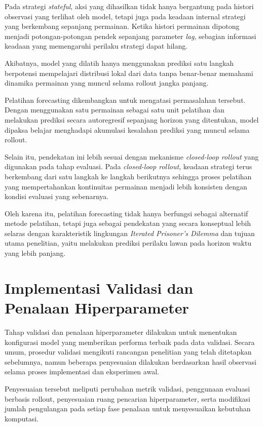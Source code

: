 Pada strategi \textit{stateful}, aksi yang dihasilkan tidak hanya bergantung pada histori observasi yang terlihat oleh model, tetapi juga pada keadaan internal strategi yang berkembang sepanjang permainan. Ketika histori permainan dipotong menjadi potongan-potongan pendek sepanjang parameter \textit{lag}, sebagian informasi keadaan yang memengaruhi perilaku strategi dapat hilang.

Akibatnya, model yang dilatih hanya menggunakan prediksi satu langkah berpotensi mempelajari distribusi lokal dari data tanpa benar-benar memahami dinamika permainan yang muncul selama rollout jangka panjang.

Pelatihan forecasting dikembangkan untuk mengatasi permasalahan tersebut. Dengan menggunakan satu permainan sebagai satu unit pelatihan dan melakukan prediksi secara autoregresif sepanjang horizon yang ditentukan, model dipaksa belajar menghadapi akumulasi kesalahan prediksi yang muncul selama rollout.

Selain itu, pendekatan ini lebih sesuai dengan mekanisme \textit{closed-loop rollout} yang digunakan pada tahap evaluasi. Pada \textit{closed-loop rollout}, keadaan strategi terus berkembang dari satu langkah ke langkah berikutnya sehingga proses pelatihan yang mempertahankan kontinuitas permainan menjadi lebih konsisten dengan kondisi evaluasi yang sebenarnya.

Oleh karena itu, pelatihan forecasting tidak hanya berfungsi sebagai alternatif metode pelatihan, tetapi juga sebagai pendekatan yang secara konseptual lebih selaras dengan karakteristik lingkungan \textit{Iterated Prisoner's Dilemma} dan tujuan utama penelitian, yaitu melakukan prediksi perilaku lawan pada horizon waktu yang lebih panjang.


\section{Implementasi Validasi dan Penalaan Hiperparameter}

Tahap validasi dan penalaan hiperparameter dilakukan untuk menentukan konfigurasi model yang memberikan performa terbaik pada data validasi. Secara umum, prosedur validasi mengikuti rancangan penelitian yang telah ditetapkan sebelumnya, namun beberapa penyesuaian dilakukan berdasarkan hasil observasi selama proses implementasi dan eksperimen awal.

Penyesuaian tersebut meliputi perubahan metrik validasi, penggunaan evaluasi berbasis rollout, penyesuaian ruang pencarian hiperparameter, serta modifikasi jumlah pengulangan pada setiap fase penalaan untuk menyesuaikan kebutuhan komputasi.

